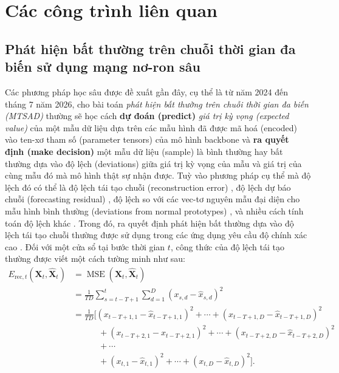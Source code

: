 \chapter{Các công trình liên quan}
\label{Chapter2}

\pagebreak
\section{Phát hiện bất thường trên chuỗi thời gian đa biến sử dụng mạng nơ-ron sâu}
Các phương pháp học sâu được đề xuất gần đây, cụ thể là từ năm 2024 đến tháng 7 năm 2026, cho bài toán \textit{phát hiện bất thường trên chuỗi thời gian đa biến (MTSAD)} thường sẽ học cách \textbf{dự đoán (predict)} \textit{giá trị kỳ vọng (expected value)} của một mẫu dữ liệu dựa trên các mẫu hình đã được mã hoá (encoded) vào ten-xơ tham số (parameter tensors) của mô hình backbone và \textbf{ra quyết định (make decision)} một mẫu dữ liệu (sample) là bình thường hay bất thường dựa vào độ lệch (deviations) giữa giá trị kỳ vọng của mẫu và giá trị của cùng mẫu đó mà mô hình thật sự nhận được. Tuỳ vào phương pháp cụ thể mà độ lệch đó có thể là độ lệch tái tạo chuỗi (reconstruction error) \cite{wei2026dess}\cite{rajan2026heights}\cite{wu2026wavae}, độ lệch dự báo chuỗi (forecasting residual) \cite{rajan2026heights}\cite{martinez2026adaptive}\cite{banerjee2026unknown}, độ lệch so với các vec-tơ nguyên mẫu đại diện cho mẫu hình bình thường (deviations from normal prototypes) \cite{shen2026gboc}\cite{jeong2026pgrf}\cite{park2026paano}, và nhiều cách tính toán độ lệch khác \cite{zhuang2024contraad}\cite{martinez2026adaptive}\cite{kim2026sacvt}\cite{li2026ngbad}. Trong đó, ra quyết định phát hiện bất thường dựa vào độ lệch tái tạo chuỗi thường được sử dụng trong các ứng dụng yêu cầu độ chính xác cao \cite{10.1145/3691338}. Đối với một cửa sổ tại bước thời gian \(t\), công thức của độ lệch tái tạo thường được viết một cách tường minh như sau:
\begin{equation}
\begin{aligned}
E_{\mathrm{rec},t}(\mathbf{X}_t,\widehat{\mathbf{X}}_t)
&=
\operatorname{MSE}(\mathbf{X}_t,\widehat{\mathbf{X}}_t)
\\[4pt]
&=
\frac{1}{TD}
\sum_{s=t-T+1}^{t}
\sum_{d=1}^{D}
\left(x_{s,d}-\widehat{x}_{s,d}\right)^2
\\[4pt]
&=
\frac{1}{TD}
\Big[
(x_{t-T+1,1}-\widehat{x}_{t-T+1,1})^2
+\cdots+
(x_{t-T+1,D}-\widehat{x}_{t-T+1,D})^2
\\
&\qquad\quad+
(x_{t-T+2,1}-\widehat{x}_{t-T+2,1})^2
+\cdots+
(x_{t-T+2,D}-\widehat{x}_{t-T+2,D})^2
\\
&\qquad\quad+
\cdots
\\
&\qquad\quad+
(x_{t,1}-\widehat{x}_{t,1})^2
+\cdots+
(x_{t,D}-\widehat{x}_{t,D})^2
\Big].
\end{aligned}
\label{eq:reconstruction-error}
\end{equation}

